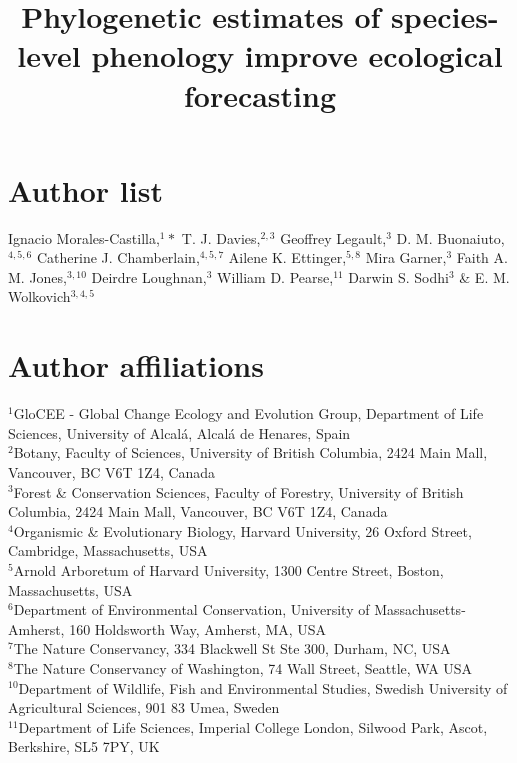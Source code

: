 \documentclass[11pt]{article}
\begin{document}



\title{Phylogenetic estimates of species-level phenology improve ecological forecasting}

\maketitle
\date{}
\vspace{-5ex}


\section*{Author list} 
Ignacio Morales-Castilla,$^{1}*$ T. J. Davies,$^{2,3}$ Geoffrey Legault,$^{3}$ D. M. Buonaiuto,$^{4,5,6}$ Catherine J. Chamberlain,$^{4,5,7}$ Ailene K. Ettinger,$^{5,8}$ Mira Garner,$^{3}$ Faith A. M. Jones,$^{3,10}$ Deirdre Loughnan,$^{3}$ William D. Pearse,$^{11}$ Darwin S. Sodhi$^{3}$ \& E. M. Wolkovich$^{3,4,5}$  \vspace{2ex}\\
\vspace{-5ex}

\section*{Author affiliations} 
$^{1}$GloCEE - Global Change Ecology and Evolution Group, Department of Life Sciences, University of Alcal\'a, Alcal\'a de Henares, Spain\\ %
 $^{2}$Botany, Faculty of Sciences, University of British Columbia, 2424 Main Mall, Vancouver, BC V6T 1Z4, Canada\\
$^{3}$Forest \& Conservation Sciences, Faculty of Forestry, University of British Columbia, 2424 Main Mall, Vancouver, BC V6T 1Z4, Canada\\
$^{4}$Organismic \& Evolutionary Biology, Harvard University, 26 Oxford Street, Cambridge, Massachusetts, USA\\
$^{5}$Arnold Arboretum of Harvard University, 1300 Centre Street, Boston, Massachusetts, USA\\
$^{6}$Department of Environmental Conservation, University of Massachusetts-Amherst, 160 Holdsworth Way, Amherst, MA, USA\\  %
 $^{7}$The Nature Conservancy, 334 Blackwell St Ste 300, Durham, NC, USA \\ %
$^{8}$The Nature Conservancy of Washington, 74 Wall Street, Seattle, WA  USA \\ %
$^{10}$Department of Wildlife, Fish and Environmental Studies, Swedish University of Agricultural Sciences, 901 83 Umea, Sweden\\ %
$^{11}$Department of Life Sciences, Imperial College London, Silwood Park, Ascot, Berkshire, SL5 7PY, UK\\
\end{document}
